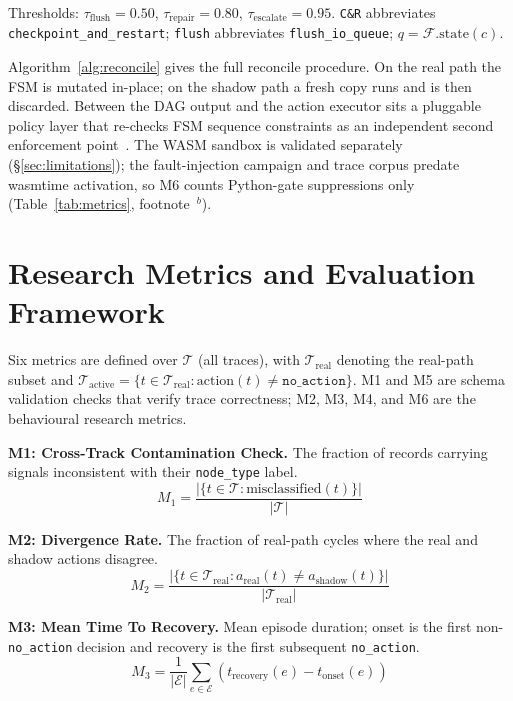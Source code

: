 \documentclass[conference]{IEEEtran}
\begin{document}
Thresholds: $\tau_{\mathrm{flush}} = 0.50$, $\tau_{\mathrm{repair}} = 0.80$, $\tau_{\mathrm{escalate}} = 0.95$. \texttt{C\&R} abbreviates \texttt{checkpoint\_and\_restart}; \texttt{flush} abbreviates \texttt{flush\_io\_queue}; $q = \mathcal{F}.\mathrm{state}(c)$.

Algorithm~\ref{alg:reconcile} gives the full reconcile procedure. On the real path the FSM is mutated in-place; on the shadow path a fresh copy runs and is then discarded. Between the DAG output and the action executor sits a pluggable policy layer that re-checks FSM sequence constraints as an independent second enforcement point~\cite{b4}. The WASM sandbox is validated separately (§\ref{sec:limitations}); the fault-injection campaign and trace corpus predate wasmtime activation, so M6 counts Python-gate suppressions only (Table~\ref{tab:metrics}, footnote~$^{b}$).

\section{Research Metrics and Evaluation Framework}
\label{sec:metrics}

Six metrics are defined over $\mathcal{T}$ (all traces), with $\mathcal{T}_{\mathrm{real}}$ denoting the real-path subset and $\mathcal{T}_{\mathrm{active}} = \{t \in \mathcal{T}_{\mathrm{real}} : \mathrm{action}(t) \neq \texttt{no\_action}\}$. M1 and M5 are schema validation checks that verify trace correctness; M2, M3, M4, and M6 are the behavioural research metrics.

\textbf{M1: Cross-Track Contamination Check.} The fraction of records carrying signals inconsistent with their \texttt{node\_type} label.
\begin{equation}
M_1 = \frac{|\{t \in \mathcal{T} : \mathrm{misclassified}(t)\}|}{|\mathcal{T}|}
\label{eq:M1}
\end{equation}

\textbf{M2: Divergence Rate.} The fraction of real-path cycles where the real and shadow actions disagree.
\begin{equation}
M_2 = \frac{|\{t \in \mathcal{T}_{\mathrm{real}} : a_{\mathrm{real}}(t) \neq a_{\mathrm{shadow}}(t)\}|}{|\mathcal{T}_{\mathrm{real}}|}
\label{eq:M2}
\end{equation}

\textbf{M3: Mean Time To Recovery.} Mean episode duration; onset is the first non-\texttt{no\_action} decision and recovery is the first subsequent \texttt{no\_action}.
\begin{equation}
M_3 = \frac{1}{|\mathcal{E}|} \sum_{e \in \mathcal{E}} \!\left(t_{\mathrm{recovery}}(e) - t_{\mathrm{onset}}(e)\right)
\label{eq:M3}
\end{equation}
\end{document}
